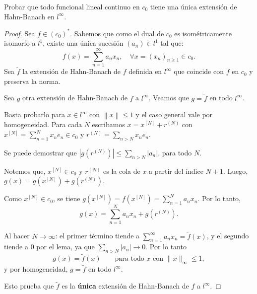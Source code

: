 \documentclass{article}
\theoremstyle{definition}
\newcommand{\norm}[1]{\left\lVert #1 \right\rVert}       %
\newenvironment{ejercicio}[1]{\begin{trivlist}
\item[\hskip \labelsep {\bfseries Ejercicio}\hskip \labelsep {\bfseries #1.}]}{\end{trivlist}}
\begin{document}
\vspace{0.5cm}

\begin{ejercicio}{6}
    Probar que todo funcional lineal continuo en \(c_0\) tiene una única extensión de Hahn-Banach en \(l^{\infty}\).
\end{ejercicio}
\begin{proof}
    Sea \( f \in {(c_0)}^* \). Sabemos que como el dual de \( c_0 \) es isométricamente isomorfo a \( l^1 \), existe una única sucesión \( (a_n) \in l^1 \) tal que:
    \[
        f(x) = \sum_{n=1}^{\infty} a_n x_n, \quad \forall x = {(x_n)}_{n\ge1} \in c_0.
    \]
    Sea \( \tilde f \) la extensión de Hahn-Banach de \( f \) definida en \( l^\infty \) que coincide con \( f \) en \( c_0 \) y preserva la norma.

    Sea \( g \) otra extensión de Hahn-Banach de \( f \) a \( l^\infty \). Veamos que \( g = \tilde f \) en todo \( l^\infty \).

    Basta probarlo para \( x \in l^\infty \) con \( \norm{x} \le 1 \) y el caso general vale por homogeneidad. Para cada \( N \) escribamos \( x = x^{[N]} + r^{(N)} \) con \( x^{[N]} = \sum_{n=1}^N x_n e_n \in c_0 \) y \( r^{(N)} = \sum_{n>N} x_n e_n \).

    Se puede demostrar que \( |g(r^{(N)})| \le \sum_{n>N} |a_n| \), para todo \( N \).

    Notemos que, \( x^{[N]} \in c_0 \) y \( r^{(N)} \) es la cola de \( x \) a partir del índice \( N+1 \). Luego, \( g(x) = g(x^{[N]}) + g(r^{(N)}) \).

    Como \( x^{[N]} \in c_0 \), se tiene \( g(x^{[N]}) = f(x^{[N]}) = \sum_{n=1}^N a_n x_n \). Por lo tanto,
    \[
        g(x) = \sum_{n=1}^N a_n x_n + g(r^{(N)}).
    \]

    Al hacer \( N\to\infty \): el primer término tiende a \( \sum_{n=1}^\infty a_n x_n=\tilde f(x) \), y el segundo tiende a \( 0 \) por el lema, ya que \( \sum_{n>N}|a_n|\to0 \). Por lo tanto
    \[
        g(x)=\tilde f(x)\qquad\text{para todo }x\text{ con }\|x\|_\infty\le1,
    \]
    y por homogeneidad, \( g=\tilde f \) en todo \( l^\infty \).

    Esto prueba que \( \tilde f \) es la \textbf{única} extensión de Hahn-Banach de \( f \) a \( l^\infty \).
\end{proof}

\vspace{0.5cm}
\end{document}
